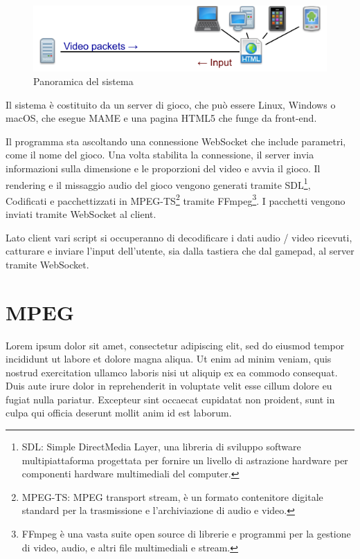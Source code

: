 \begin{figure}[H]
	\includegraphics[width=\linewidth]{immagini/proposed_system}
	\caption{Panoramica del sistema}
	\label{fig:proposed_system}
\end{figure}

Il sistema è costituito da un server di gioco, che può essere Linux, Windows o macOS, che esegue MAME e una pagina HTML5 che funge da front-end.

Il programma sta ascoltando una connessione WebSocket che include parametri, come il nome del gioco. Una volta stabilita la connessione, il server invia informazioni sulla dimensione e le proporzioni del video e avvia il gioco. Il rendering e il missaggio audio del gioco vengono generati tramite SDL\footnote{SDL: Simple DirectMedia Layer, una libreria di sviluppo software multipiattaforma progettata per fornire un livello di astrazione hardware per componenti hardware multimediali del computer.}, Codificati e pacchettizzati in MPEG-TS\footnote{MPEG-TS: MPEG transport stream, è un formato contenitore digitale standard per la trasmissione e l'archiviazione di audio e video.} tramite FFmpeg\footnote{FFmpeg è una vasta suite open source di librerie e programmi per la gestione di video, audio, e altri file multimediali e stream.}. I pacchetti vengono inviati tramite WebSocket al client.

Lato client vari script si occuperanno di decodificare i dati audio / video ricevuti, catturare e inviare l'input dell'utente, sia dalla tastiera che dal gamepad, al server tramite WebSocket.

\section{MPEG}
Lorem ipsum dolor sit amet, consectetur adipiscing elit, sed do eiusmod tempor incididunt ut labore et dolore magna aliqua. Ut enim ad minim veniam, quis nostrud exercitation ullamco laboris nisi ut aliquip ex ea commodo consequat. Duis aute irure dolor in reprehenderit in voluptate velit esse cillum dolore eu fugiat nulla pariatur. Excepteur sint occaecat cupidatat non proident, sunt in culpa qui officia deserunt mollit anim id est laborum.

